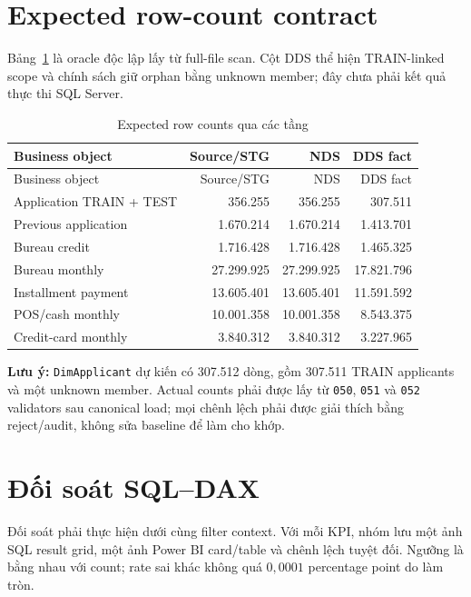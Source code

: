 \documentclass[12pt,a4paper,oneside]{report}
\begin{document}
\section{Expected row-count contract}
Bảng~\ref{tab:expected-counts} là oracle độc lập lấy từ full-file scan. Cột DDS thể hiện TRAIN-linked scope và chính sách giữ orphan bằng unknown member; đây chưa phải kết quả thực thi SQL Server.

\begin{longtable}{p{4.1cm}r r r}
\caption{Expected row counts qua các tầng}\label{tab:expected-counts}\\
\toprule
Business object & Source/STG & NDS & DDS fact \\
\midrule
\endfirsthead
\toprule Business object & Source/STG & NDS & DDS fact \\
\midrule
\endhead
Application TRAIN + TEST & 356.255 & 356.255 & 307.511 \\
Previous application & 1.670.214 & 1.670.214 & 1.413.701 \\
Bureau credit & 1.716.428 & 1.716.428 & 1.465.325 \\
Bureau monthly & 27.299.925 & 27.299.925 & 17.821.796 \\
Installment payment & 13.605.401 & 13.605.401 & 11.591.592 \\
POS/cash monthly & 10.001.358 & 10.001.358 & 8.543.375 \\
Credit-card monthly & 3.840.312 & 3.840.312 & 3.227.965 \\
\bottomrule
\end{longtable}

\noindent\textbf{Lưu ý:} \texttt{DimApplicant} dự kiến có 307.512 dòng, gồm 307.511 TRAIN applicants và một unknown member. Actual counts phải được lấy từ \texttt{050}, \texttt{051} và \texttt{052} validators sau canonical load; mọi chênh lệch phải được giải thích bằng reject/audit, không sửa baseline để làm cho khớp.

\section{Đối soát SQL--DAX}
Đối soát phải thực hiện dưới cùng filter context. Với mỗi KPI, nhóm lưu một ảnh SQL result grid, một ảnh Power BI card/table và chênh lệch tuyệt đối. Ngưỡng là bằng nhau với count; rate sai khác không quá $0{,}0001$ percentage point do làm tròn.
\end{document}
